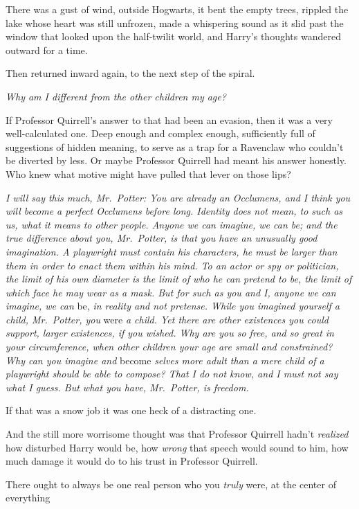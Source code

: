 There was a gust of wind, outside Hogwarts, it bent the empty trees, rippled
the lake whose heart was still unfrozen, made a whispering sound as it slid
past the window that looked upon the half-twilit world, and Harry's thoughts
wandered outward for a time.

Then returned inward again, to the next step of the spiral.

\emph{Why am I different from the other children my age?}

If Professor Quirrell's answer to that had been an evasion, then it was a very
well-calculated one. Deep enough and complex enough, sufficiently full of
suggestions of hidden meaning, to serve as a trap for a Ravenclaw who couldn't
be diverted by less. Or maybe Professor Quirrell had meant his answer honestly.
Who knew what motive might have pulled that lever on those lips?

\emph{I will say this much, Mr.~Potter: You are already an Occlumens, and I
think you will become a perfect Occlumens before long. Identity does not mean,
to such as us, what it means to other people. Anyone we can imagine, we can be;
and the true difference about you, Mr.~Potter, is that you have an unusually
good imagination. A playwright must contain his characters, he must be larger
than them in order to enact them within his mind. To an actor or spy or
politician, the limit of his own diameter is the limit of who he can pretend to
be, the limit of which face he may wear as a mask. But for such as you and I,
anyone we can imagine, we can} be, \emph{in reality and not pretense. While you
imagined yourself a child, Mr.~Potter, you} were \emph{a child. Yet there are
other existences you could support, larger existences, if you wished. Why are
you so free, and so great in your circumference, when other children your age
are small and constrained? Why can you imagine and} become \emph{selves more
adult than a mere child of a playwright should be able to compose? That I do
not know, and I must not say what I guess. But what you have, Mr.~Potter, is
freedom.}

If that was a snow job it was one heck of a distracting one.

And the still more worrisome thought was that Professor Quirrell hadn't
\emph{realized} how disturbed Harry would be, how \emph{wrong} that speech
would sound to him, how much damage it would do to his trust in Professor
Quirrell.

There ought to always be one real person who you \emph{truly} were, at the
center of everything{\el}

